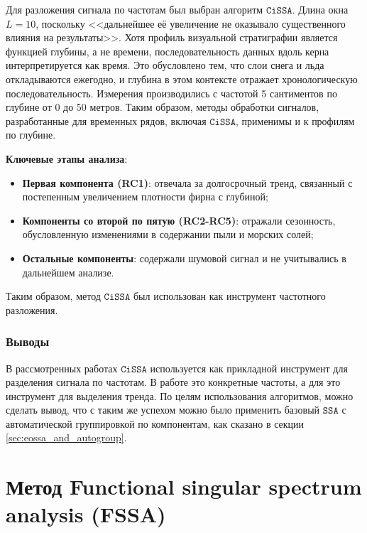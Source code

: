 \documentclass[12pt, specialist, subf
]{disser}
\theoremstyle{definition}
\newcommand{\SSA}{\texttt{SSA}}
\newcommand{\CISSA}{\texttt{CiSSA}}
\begin{document}
Для разложения сигнала по частотам был выбран алгоритм $\CISSA$. Длина окна $L = 10$, поскольку <<дальнейшее её увеличение не оказывало существенного влияния на результаты>>. Хотя профиль визуальной стратиграфии является функцией глубины, а не времени, последовательность данных вдоль керна интерпретируется как время. Это обусловлено тем, что слои снега и льда откладываются ежегодно, и глубина в этом контексте отражает хронологическую последовательность. Измерения производились с частотой 5 сантиментов по глубине от 0 до 50 метров. Таким образом, методы обработки сигналов, разработанные для временных рядов, включая $\CISSA$, применимы и к профилям по глубине. 


\noindent \textbf{Ключевые этапы анализа}:

\begin{itemize}
	\item \textbf{Первая компонента (RC1)}: отвечала за долгосрочный тренд, связанный с постепенным увеличением плотности фирна с глубиной;
	\item \textbf{Компоненты со второй по пятую (RC2-RC5)}: отражали сезонность, обусловленную изменениями в содержании пыли и морских солей;
	\item \textbf{Остальные компоненты}: содержали шумовой сигнал и не учитывались в дальнейшем анализе.
\end{itemize}

Таким образом, метод $\CISSA$ был использован как инструмент частотного разложения.

\subsection{Выводы}

В рассмотренных работах $\CISSA$ используется как прикладной инструмент для разделения сигнала по частотам. В работе \cite{cognitive} это конкретные частоты, а для \cite{Dey_Thamban_Laluraj_Mahalinganathan_Redkar_Kumar_Matsuoka_2023} это инструмент для выделения тренда. По целям использования алгоритмов, можно сделать вывод, что с таким же успехом можно было применить базовый $\SSA$ с автоматической группировкой по компонентам, как сказано в секции \ref{sec:eossa_and_autogroup}.


\newpage








\chapter{Метод Functional singular spectrum analysis (FSSA)}
\label{sec:fssa}
\end{document}
